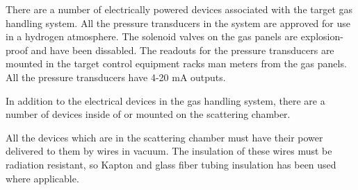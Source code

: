 \begin{safetyen}{0}{0}
{There are a number of electrically powered devices associated with
the target gas handling system. All the pressure transducers in the
system are approved for use in a hydrogen atmosphere. The solenoid
valves on the gas panels are explosion-proof and have been dissabled.
The readouts for the pressure transducers are mounted in the target
control equipment racks man meters from the gas panels. All the pressure
transducers have 4-20 mA outputs.

In addition to the electrical devices in the gas handling system,
there are a number of devices inside of or mounted on the scattering
chamber.

All the devices which are in the scattering chamber must have their
power delivered to them by wires in vacuum. The insulation of these
wires must be radiation resistant, so Kapton and glass fiber tubing
insulation has been used where applicable.

}
\end{safetyen}
